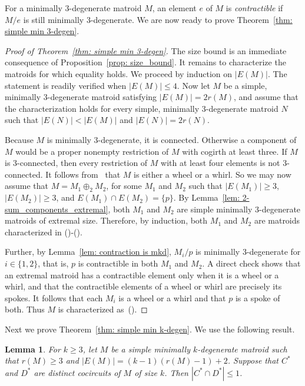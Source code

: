 \documentclass{amsart}
\newcommand{\romannum}[1]{\romannumeral#1\relax}
\newtheorem{lemma}[theorem]{Lemma}
\theoremstyle{definition}
\theoremstyle{remark}
\numberwithin{equation}{section}
\begin{document}
For a minimally $3$-degenerate matroid $M$, an element $e$ of $M$ is \textit{contractible} if $M/e$ is still minimally $3$-degenerate. We are now ready to prove Theorem~\ref{thm: simple min 3-degen}. 

\begin{proof}[Proof of Theorem~\ref{thm: simple min 3-degen}]
    The size bound is an immediate consequence of Proposition~\ref{prop: size_bound}. It remains to characterize the matroids for which equality holds. We proceed by induction on $|E(M)|$. The statement is readily verified when $|E(M)|\leq 4$. Now let $M$ be a simple, minimally $3$-degenerate matroid satisfying $|E(M)|=2r(M)$, and assume that the characterization holds for every simple, minimally $3$-degenerate matroid $N$ such that $|E(N)|<|E(M)|$ and $|E(N)|=2r(N)$.
    
    Because $M$ is minimally $3$-degenerate, it is connected. Otherwise a component of $M$ would be a proper nonempty restriction of $M$ with cogirth at least three. If $M$ is $3$-connected, then every restriction of $M$ with at least four elements is not $3$-connected. It follows from~\cite[Theorem 1.2]{sm3c_matroid} that $M$ is either a wheel or a whirl. So we may now assume that $M=M_1\oplus_2 M_2$, for some $M_1$ and $M_2$ such that $|E(M_1)|\geq 3$, $|E(M_2)|\geq 3$, and $E(M_1)\cap E(M_2)=\{p\}$. By Lemma~\ref{lem: 2-sum_components_extremal}, both $M_1$ and $M_2$ are simple minimally $3$-degenerate matroids of extremal size. Therefore, by induction, both $M_1$ and $M_2$ are matroids characterized in (\romannum{1})-(\romannum{3}).

    Further, by Lemma~\ref{lem: contraction is mkd}, $M_i/p$ is minimally $3$-degenerate for $i\in\{1,2\}$, that is, $p$ is contractible in both $M_1$ and $M_2$. A direct check shows that an extremal matroid has a contractible element only when it is a wheel or a whirl, and that the contractible elements of a wheel or whirl are precisely its spokes. It follows that each $M_i$ is a wheel or a whirl and that $p$ is a spoke of both. Thus $M$ is characterized as~(\romannum{3}).
\end{proof}



Next we prove Theorem~\ref{thm: simple min k-degen}. We use the following result.


\begin{lemma}
\label{lem: cocircuit_intersection}
For $k \geq 3$, let $M$ be a simple minimally $k$-degenerate matroid such that $r(M) \geq 3$ and $|E(M)| = (k-1)(r(M)-1)+2$. Suppose that $C^*$ and $D^*$ are distinct cocircuits of $M$ of size $k$. Then $|C^* \cap D^*| \leq 1$. 
\end{lemma}
\end{document}
